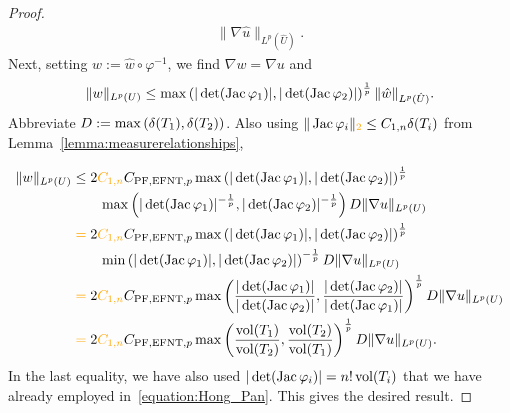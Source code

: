 \documentclass[10pt,letterpaper]{article}
\newcommand\cye[1]{%
  \protect\leavevmode
  \begingroup
    \color{red!35!yellow}%
    #1%
  \endgroup
}
\begin{document}
\begin{proof}
\begin{align*}
        \| \nabla \hat u \|_{L^{p}(\hat U)}
        .
    \end{align*}
    Next, setting $w := \hat w \circ \varphi^{-1}$, we find $\nabla w = \nabla u$ and 
    \begin{align*}
        \| w \|_{L^{p}(U)}
        \leq 
        \max\left( 
            |\det(\operatorname{{\rm Jac}} \varphi_1)|
            ,
            |\det(\operatorname{{\rm Jac}} \varphi_2)|
        \right)^{\frac 1 p}
        \| \hat w \|_{L^{p}(\hat U)}
        .
    \end{align*}
    Abbreviate $D := \max\left( {\delta}(T_1), {\delta}(T_2) \right)$. \cye{Also using $\| \Jacobian \varphi_i \|_{\cye{2}} \leq \Ceins{n} \diam(T_i)$ from Lemma~\ref{lemma:measurerelationships},}
    \begin{align*}
        \| w \|_{L^{p}(U)}
        &\leq 
        2 \cye{\Ceins{n}} C_{\PF,{\rm EFNT},p}
        \max\left( 
            |\det(\Jacobian \varphi_1)|
            ,
            |\det(\Jacobian \varphi_2)|
        \right)^{\frac 1 p}
        \\&\qquad 
        \max\left( 
            |\det(\Jacobian \varphi_1)|^{-\frac 1 p} 
            ,
            |\det(\Jacobian \varphi_2)|^{-\frac 1 p} 
        \right)
        D
        \| \nabla u \|_{L^{p}(U)}
        \\&
        \cye{=} 
        2 \cye{\Ceins{n}} C_{\PF,{\rm EFNT},p}
        \max\left( 
            |\det(\Jacobian \varphi_1)|
            ,
            |\det(\Jacobian \varphi_2)|
        \right)^{\frac 1 p}
        \\&\qquad 
        \min\left( 
            |\det(\Jacobian \varphi_1)|
            ,
            |\det(\Jacobian \varphi_2)| 
        \right)^{-\frac 1 p} 
        D
        \| \nabla u \|_{L^{p}(U)}
        \\&
        \cye{=} 
        2 \cye{\Ceins{n}} C_{\PF,{\rm EFNT},p}
        \max\left( 
            \frac{ |\det(\Jacobian \varphi_1)| }{ |\det(\Jacobian \varphi_2)| }
            ,
            \frac{ |\det(\Jacobian \varphi_2)| }{ |\det(\Jacobian \varphi_1)| }
        \right)^{\frac 1 p}
        D
        \| \nabla u \|_{L^{p}(U)}
        \\&
        \cye{=} 
        2 \cye{\Ceins{n}} C_{\PF,{\rm EFNT},p}
        \max\left( 
            \frac{ \vol(T_1) }{ \vol(T_2) }
            ,
            \frac{ \vol(T_2) }{ \vol(T_1) }
        \right)^{\frac 1 p}
        D
        \| \nabla u \|_{L^{p}(U)}
        .
    \end{align*}
    \cye{In the last equality, we have also used $|\det(\operatorname{{\rm Jac}}\varphi_i)| = n! \operatorname{vol}(T_i)$ that we have already employed in~\eqref{equation:Hong_Pan}.} This gives the desired result. 
\end{proof}
\end{document}
